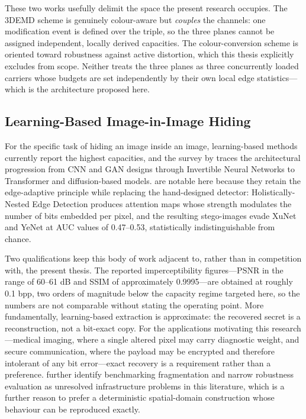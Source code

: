 These two works usefully delimit the space the present research occupies. The 3DEMD scheme is genuinely colour-aware but \textit{couples} the channels: one modification event is defined over the triple, so the three planes cannot be assigned independent, locally derived capacities. The colour-conversion scheme is oriented toward robustness against active distortion, which this thesis explicitly excludes from scope. Neither treats the three planes as three concurrently loaded carriers whose budgets are set independently by their own local edge statistics---which is the architecture proposed here.

\subsection{Learning-Based Image-in-Image Hiding}
For the specific task of hiding an image inside an image, learning-based methods currently report the highest capacities, and the survey by \citet{janok2026survey} traces the architectural progression from CNN and GAN designs through Invertible Neural Networks to Transformer and diffusion-based models. \citet{alrawashdeh2025hed} are notable here because they retain the edge-adaptive principle while replacing the hand-designed detector: Holistically-Nested Edge Detection produces attention maps whose strength modulates the number of bits embedded per pixel, and the resulting stego-images evade XuNet and YeNet at AUC values of 0.47--0.53, statistically indistinguishable from chance.

Two qualifications keep this body of work adjacent to, rather than in competition with, the present thesis. The reported imperceptibility figures---PSNR in the range of 60--61 dB and SSIM of approximately 0.9995---are obtained at roughly 0.1 bpp, two orders of magnitude below the capacity regime targeted here, so the numbers are not comparable without stating the operating point. More fundamentally, learning-based extraction is approximate: the recovered secret is a reconstruction, not a bit-exact copy. For the applications motivating this research---medical imaging, where a single altered pixel may carry diagnostic weight, and secure communication, where the payload may be encrypted and therefore intolerant of any bit error---exact recovery is a requirement rather than a preference. \citet{janok2026survey} further identify benchmarking fragmentation and narrow robustness evaluation as unresolved infrastructure problems in this literature, which is a further reason to prefer a deterministic spatial-domain construction whose behaviour can be reproduced exactly.

